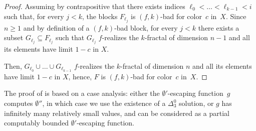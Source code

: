 \documentclass{article}
\numberwithin{theorem}{section}
\newtheorem{lemma}[theorem]{Lemma}
\newcommand{\ludovic}[1]{\textcolor{blue}{#1}}
\newcommand{\NN}[0]{\mathbb{N}}
\begin{document}
\begin{proof}
Assuming by contrapositive that there exists indices $\ell_0 < \dots < \ell_{k-1} < i$ such that, for every $j < k$, the blocks $F_{\ell_j}$ is $(f,k)$-bad for color~$c$ in~$X$. Since $n \geq 1$ and by definition of a $(f,k)$-bad block, for every $j < k$ there exists a subset $G_{\ell_j} \subseteq F_{\ell_j}$ such that $G_{\ell_j}$ $f$-realizes the $k$-fractal of dimension $n-1$ and all its elements have limit $1-c$ in $X$.

Then, $G_{\ell_0} \cup \dots \cup G_{\ell_{k-1}}$ $f$-realizes the $k$-fractal of dimension $n$ and all its elements have limit $1-c$ in $X$, hence, $F$ is $(f, k)$-bad for color~$c$ in~$X$. 
\end{proof}

The proof of  is based on a case analysis: either the $\emptyset'$-escaping function~$g$ computes $\emptyset''$, in which case we use the existence of a $\Delta^0_3$ solution, or $g$ has infinitely many relatively small values, and can be considered as a partial computably bounded $\emptyset'$-escaping function. 

\end{document}

